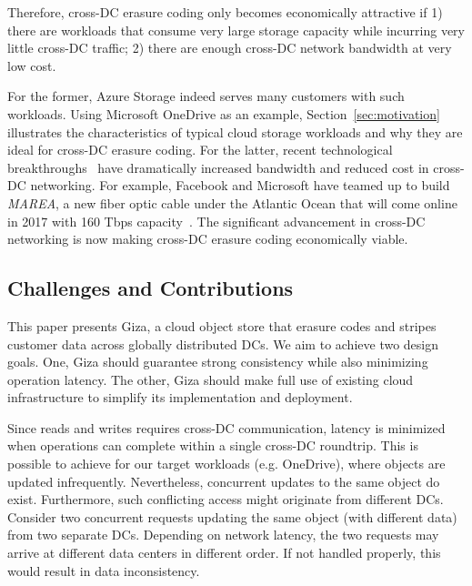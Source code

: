 Therefore, cross-DC erasure coding only becomes economically attractive if 1)
there are workloads that consume very large storage capacity while incurring very
little cross-DC traffic; 2) there are enough cross-DC network bandwidth at very
low cost.

For the former, Azure Storage indeed serves many customers
with such workloads. Using Microsoft OneDrive as an example,
Section~\ref{sec:motivation} illustrates the characteristics of typical cloud storage workloads
and why they are ideal for cross-DC erasure coding.
For the latter, recent technological breakthroughs~\cite{mears1986low, zhu2011112}
have dramatically increased bandwidth and reduced cost in cross-DC networking.
For example, Facebook and Microsoft have teamed up to build \textit{MAREA},
a new fiber optic cable under the Atlantic Ocean 
that will come online in 2017 with 160 Tbps capacity~\cite{bib:MAREA1, bib:MAREA2}.
The significant advancement in cross-DC networking is now making cross-DC erasure coding economically viable.


\subsection{Challenges and Contributions}
This paper presents Giza, a cloud object store that erasure codes and stripes
customer data across globally distributed DCs.  We aim to achieve two design
goals. One, Giza should guarantee strong consistency while also minimizing
operation latency.  The other, Giza should make full use of existing cloud
infrastructure to simplify its implementation and deployment.

Since reads and writes requires cross-DC communication, latency is minimized 
when operations can complete within a single cross-DC roundtrip.  This is 
possible to achieve for our target workloads (e.g. OneDrive), where 
objects are updated infrequently.
Nevertheless, concurrent updates to the same object do exist.
Furthermore, such conflicting access might originate from different DCs.
Consider two concurrent requests updating the same object (with different data)
from two separate DCs. Depending on network latency, the two requests may
arrive at different data centers in different order. If not handled properly,
this would result in data inconsistency.  

